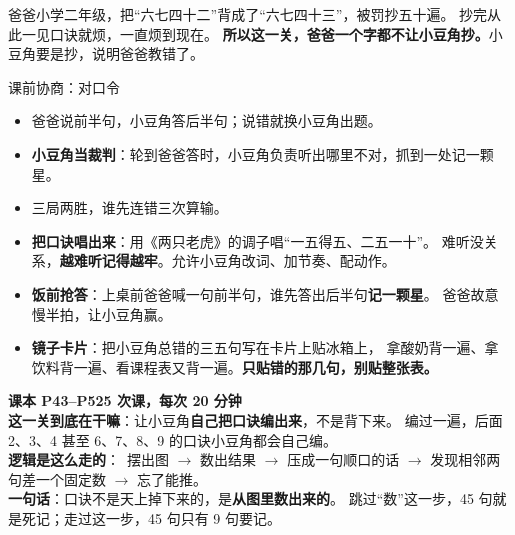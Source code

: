 
\begin{blunder}
爸爸小学二年级，把“六七四十二”背成了“六七四十三”，被罚抄五十遍。
抄完从此一见口诀就烦，一直烦到现在。
\textbf{所以这一关，爸爸一个字都不让小豆角抄。}小豆角要是抄，说明爸爸教错了。
\end{blunder}

\begin{gamble}{课前协商：对口令}
\begin{itemize}
  \item 爸爸说前半句，小豆角答后半句；说错就换小豆角出题。
  \item \textbf{小豆角当裁判}：轮到爸爸答时，小豆角负责听出哪里不对，抓到一处记一颗星。\waterdrop
  \item 三局两胜，谁先连错三次算输。
\end{itemize}
\negolines
\end{gamble}

\begin{bonus}
\begin{itemize}
  \item \textbf{把口诀唱出来}：用《两只老虎》的调子唱“一五得五、二五一十”。
        难听没关系，\textbf{越难听记得越牢}。允许小豆角改词、加节奏、配动作。
  \item \textbf{饭前抢答}：上桌前爸爸喊一句前半句，谁先答出后半句\textbf{记一颗星}。
        爸爸故意慢半拍，让小豆角赢。
  \item \textbf{镜子卡片}：把小豆角总错的三五句写在卡片上贴冰箱上，
        拿酸奶背一遍、拿饮料背一遍、看课程表又背一遍。\textbf{只贴错的那几句，别贴整张表。}
\end{itemize}
\end{bonus}

\begin{unitinfo}
\textbf{课本 P43--P52}\quad \textbf{5 次课，每次 20 分钟} \\[4pt]
\textbf{这一关到底在干嘛}：让小豆角\textbf{自己把口诀编出来}，不是背下来。
编过一遍，后面 2、3、4 甚至 6、7、8、9 的口诀小豆角都会自己编。\\
\textbf{逻辑是这么走的}：\ 摆出图 $\to$ 数出结果 $\to$ 压成一句顺口的话
$\to$ 发现相邻两句差一个固定数 $\to$ 忘了能推。\\
\textbf{一句话}：口诀不是天上掉下来的，是\textbf{从图里数出来的}。
跳过“数”这一步，45 句就是死记；走过这一步，45 句只有 9 句要记。
\end{unitinfo}

